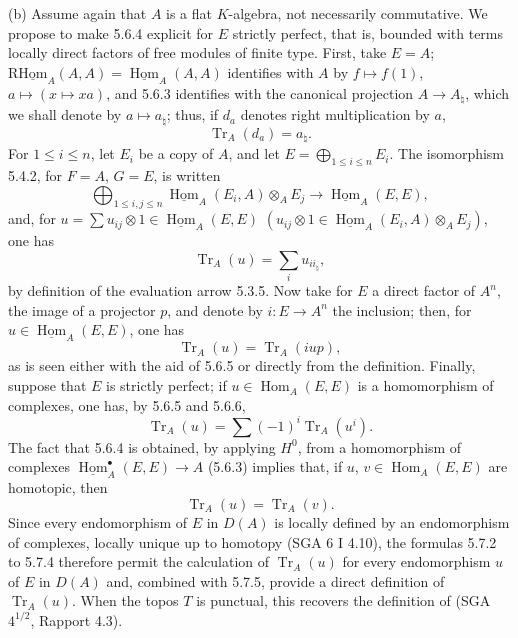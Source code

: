 \documentclass[11pt]{article}
\providecommand{\uHom}{\underline{\Hom}}
\DeclareMathOperator{\Hom}{Hom}
\providecommand{\Tr}{\operatorname{Tr}}
\providecommand{\Tr}{\operatorname{Tr}}
\providecommand{\Tr}{\operatorname{Tr}}
\providecommand{\Hom}{\operatorname{Hom}}
\providecommand{\Tr}{\operatorname{Tr}}
\providecommand{\Hom}{\operatorname{Hom}}
\providecommand{\Tr}{\operatorname{Tr}}
\begin{document}
(b) Assume again that $A$ is a flat $K$-algebra, not necessarily commutative. We propose to make 5.6.4 explicit for $E$ strictly perfect, that is, bounded with terms locally direct factors of free modules of finite type. First, take $E=A$; $\mathrm{R}\underline{\mathrm{Hom}}_A(A,A)=\uHom_A(A,A)$ identifies with $A$ by $f\mapsto f(1)$, $a\mapsto(x\mapsto xa)$, and 5.6.3 identifies with the canonical projection $A\to A_\natural$, which we shall denote by $a\mapsto a_\natural$; thus, if $d_a$ denotes right multiplication by $a$,
\begin{equation}\tag{5.7.1}
\Tr_A(d_a)=a_\natural.
\end{equation}
For $1\le i\le n$, let $E_i$ be a copy of $A$, and let $E=\bigoplus_{1\le i\le n}E_i$. The isomorphism 5.4.2, for $F=A$, $G=E$, is written
\[
\bigoplus_{1\le i,j\le n}\uHom_A(E_i,A)\otimes_AE_j\longrightarrow\uHom_A(E,E),
\]
and, for $u=\sum u_{ij}\otimes 1\in\uHom_A(E,E)$ $(u_{ij}\otimes 1\in\uHom_A(E_i,A)\otimes_A E_j)$, one has
\begin{equation}\tag{5.7.2}
\Tr_A(u)=\sum_i u_{ii_\natural},
\end{equation}
by definition of the evaluation arrow 5.3.5. Now take for $E$ a direct factor of $A^n$, the image of a projector $p$, and denote by $i:E\to A^n$ the inclusion; then, for $u\in\uHom_A(E,E)$, one has
\begin{equation}\tag{5.7.3}
\Tr_A(u)=\Tr_A(iup),
\end{equation}
as is seen either with the aid of 5.6.5 or directly from the definition. Finally, suppose that $E$ is strictly perfect; if $u\in\Hom_A(E,E)$ is a homomorphism of complexes, one has, by 5.6.5 and 5.6.6,
\begin{equation}\tag{5.7.4}
\Tr_A(u)=\sum(-1)^i\Tr_A(u^i).
\end{equation}
The fact that 5.6.4 is obtained, by applying $H^0$, from a homomorphism of complexes $\uHom_A^\bullet(E,E)\to A$ (5.6.3) implies that, if $u$, $v\in\Hom_A(E,E)$ are homotopic, then
\begin{equation}\tag{5.7.5}
\Tr_A(u)=\Tr_A(v).
\end{equation}
Since every endomorphism of $E$ in $D(A)$ is locally defined by an endomorphism of complexes, locally unique up to homotopy (SGA 6 I 4.10), the formulas 5.7.2 to 5.7.4 therefore permit the calculation of $\Tr_A(u)$ for every endomorphism $u$ of $E$ in $D(A)$ and, combined with 5.7.5, provide a direct definition of $\Tr_A(u)$. When the topos $T$ is punctual, this recovers the definition of (SGA $4^{1/2}$, Rapport 4.3).
\end{document}
